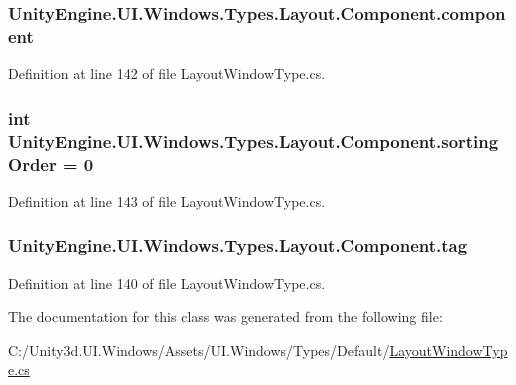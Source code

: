 \subsubsection[{component}]{ Unity\+Engine.\+U\+I.\+Windows.\+Types.\+Layout.\+Component.\+component}\label{class_unity_engine_1_1_u_i_1_1_windows_1_1_types_1_1_layout_1_1_component_a63499e5f81c68878a579e5a06b116402}


Definition at line 142 of file Layout\+Window\+Type.\+cs.

\hypertarget{class_unity_engine_1_1_u_i_1_1_windows_1_1_types_1_1_layout_1_1_component_ad0041f235def9f31884191cd89bdc7eb}{}
\subsubsection[{sorting\+Order}]{\setlength{\rightskip}{0pt plus 5cm}int Unity\+Engine.\+U\+I.\+Windows.\+Types.\+Layout.\+Component.\+sorting\+Order = 0}\label{class_unity_engine_1_1_u_i_1_1_windows_1_1_types_1_1_layout_1_1_component_ad0041f235def9f31884191cd89bdc7eb}


Definition at line 143 of file Layout\+Window\+Type.\+cs.

\hypertarget{class_unity_engine_1_1_u_i_1_1_windows_1_1_types_1_1_layout_1_1_component_a2f5b6889d2d9f2143ab64e8579d28d0c}{}
\subsubsection[{tag}]{ Unity\+Engine.\+U\+I.\+Windows.\+Types.\+Layout.\+Component.\+tag}\label{class_unity_engine_1_1_u_i_1_1_windows_1_1_types_1_1_layout_1_1_component_a2f5b6889d2d9f2143ab64e8579d28d0c}


Definition at line 140 of file Layout\+Window\+Type.\+cs.



The documentation for this class was generated from the following file\+:\begin{DoxyCompactItemize}
\item 
C\+:/\+Unity3d.\+U\+I.\+Windows/\+Assets/\+U\+I.\+Windows/\+Types/\+Default/\hyperlink{_layout_window_type_8cs}{Layout\+Window\+Type.\+cs}\end{DoxyCompactItemize}
